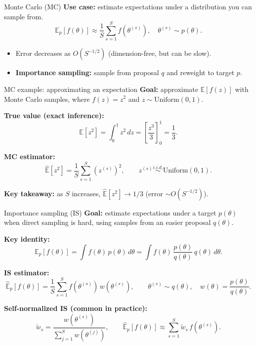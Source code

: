 \documentclass[aspectratio=169]{beamer}
\begin{document}
\begin{frame}{Monte Carlo (MC)}
  \textbf{Use case:} estimate expectations under a distribution you can sample from.
  \[
    \mathbb{E}_{p}[f(\theta)]
    \approx
    \frac{1}{S}\sum_{s=1}^S f(\theta^{(s)}), \quad \theta^{(s)}\sim p(\theta).
  \]
  \begin{itemize}
    \item Error decreases as $O(S^{-1/2})$ (dimension-free, but can be slow).
    \item \textbf{Importance sampling:} sample from proposal $q$ and reweight to target $p$.

  \end{itemize}
\end{frame}



\begin{frame}{MC example: approximating an expectation}
  \textbf{Goal:} approximate $\mathbb{E}[f(z)]$ with Monte Carlo samples, where
  $f(z)=z^2$ and $z\sim \mathrm{Uniform}(0,1)$.

  \vspace{0.4em}
  \textbf{True value (exact inference):}
  \[
    \mathbb{E}[z^2]
    =
    \int_{0}^{1} z^2\,dz
    =
    \left[\frac{z^3}{3}\right]_{0}^{1}
    =
    \frac{1}{3}.
  \]

  \vspace{0.4em}
  \textbf{MC estimator:}
  \[
    \widehat{\mathbb{E}}[z^2]
    =
    \frac{1}{S}\sum_{s=1}^{S}\left(z^{(s)}\right)^2,
    \qquad
    z^{(s)} \stackrel{i.i.d.}{\sim} \mathrm{Uniform}(0,1).
  \]

  \vspace{0.2em}
  \textbf{Key takeaway:} as $S$ increases, $\widehat{\mathbb{E}}[z^2]\to 1/3$ (error $\sim O(S^{-1/2})$).
\end{frame}


\begin{frame}{Importance sampling (IS)}
  \textbf{Goal:} estimate expectations under a target $p(\theta)$ when direct sampling is hard,
  using samples from an easier proposal $q(\theta)$.

  \vspace{0.4em}
  \textbf{Key identity:}
  \[
    \mathbb{E}_{p}[f(\theta)]
    =
    \int f(\theta)\,p(\theta)\,d\theta
    =
    \int f(\theta)\,\frac{p(\theta)}{q(\theta)}\,q(\theta)\,d\theta.
  \]

  \textbf{IS estimator:}
  \[
    \widehat{\mathbb{E}}_{p}[f(\theta)]
    =
    \frac{1}{S}\sum_{s=1}^{S} f(\theta^{(s)})\,w(\theta^{(s)}),
    \qquad
    \theta^{(s)}\sim q(\theta),
    \quad
    w(\theta)=\frac{p(\theta)}{q(\theta)}.
  \]

  \vspace{0.4em}
  \textbf{Self-normalized IS (common in practice):}
  \[
    \tilde{w}_s=\frac{w(\theta^{(s)})}{\sum_{j=1}^{S} w(\theta^{(j)})},
    \qquad
    \widehat{\mathbb{E}}_{p}[f(\theta)]
    \approx
    \sum_{s=1}^{S} \tilde{w}_s\, f(\theta^{(s)}).
  \]


\end{frame}
\end{document}
